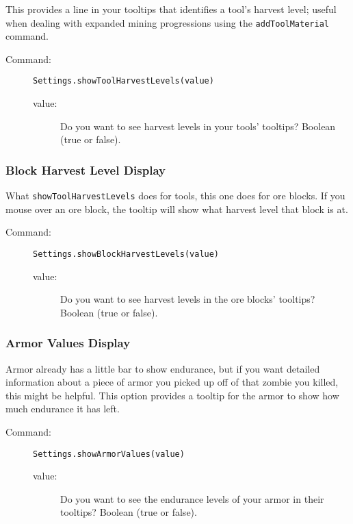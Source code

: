 \documentclass[letterpaper,titlepage,12pt]{article}
\begin{document}
This provides a line in your tooltips that identifies a tool's harvest level; useful when dealing with expanded mining progressions using the \texttt{addToolMaterial} command.

\begin{description}
\item[Command:] \texttt{Settings.showToolHarvestLevels(value)}
\begin{description}
\item [value:] Do you want to see harvest levels in your tools' tooltips?  Boolean (true or false).
\end{description}
\end{description}

\subsubsection{Block Harvest Level Display}

What \texttt{showToolHarvestLevels} does for tools, this one does for ore blocks.  If you mouse over an ore block, the tooltip will show what harvest level that block is at.

\begin{description}
\item[Command:] \texttt{Settings.showBlockHarvestLevels(value)}
\begin{description}
\item [value:] Do you want to see harvest levels in the ore blocks' tooltips?  Boolean (true or false).
\end{description}
\end{description}

\subsubsection{Armor Values Display}

Armor already has a little bar to show endurance, but if you want detailed information about a piece of armor you picked up off of that zombie you killed, this might be helpful.  This option provides a tooltip for the armor to show how much endurance it has left.

\begin{description}
\item[Command:] \texttt{Settings.showArmorValues(value)}
\begin{description}
\item [value:] Do you want to see the endurance levels of your armor in their tooltips?  Boolean (true or false).
\end{description}
\end{description}
\end{document}
